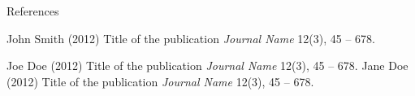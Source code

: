 \documentclass[aspectratio=169,xcolor=dvipsnames, t]{beamer}
\begin{document}
\begin{frame}{References}
    \footnotesize{
        \begin{thebibliography}{99}
             John Smith (2012)
            \newblock Title of the publication
            \newblock \emph{Journal Name} 12(3), 45 -- 678.

             Joe Doe (2012)
            \newblock Title of the publication
            \newblock \emph{Journal Name} 12(3), 45 -- 678.
             Jane Doe (2012)
            \newblock Title of the publication
            \newblock \emph{Journal Name} 12(3), 45 -- 678.
        \end{thebibliography}
    }
\end{frame}

\makefinalpage
\end{document}
